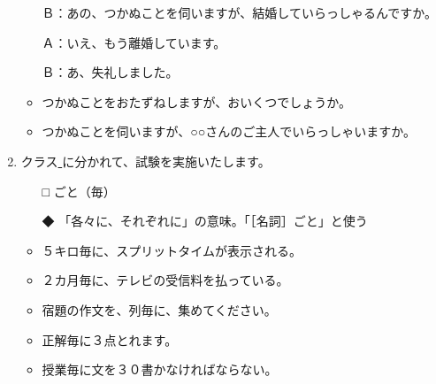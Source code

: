\documentclass[
uplatex,
b5paper,
10pt,
dvipdfmx
]{jsbook}
\begin{document}
\begin{enumerate}
\begin{itemize}
      Ｂ：あの、つかぬことを伺いますが、結婚していらっしゃるんですか。

      Ａ：いえ、もう離婚しています。

      Ｂ：あ、失礼しました。

\item つかぬことをおたずねしますが、おいくつでしょうか。
\item つかぬことを伺いますが、○○さんのご主人でいらっしゃいますか。
\end{itemize}

\item クラス\underline{   }に分かれて、試験を実施いたします。
\begin{itemize}
\item[□] ごと（毎）
\item[◆] 「各々に、それぞれに」の意味。「［名詞］ごと」と使う
\end{itemize}
\begin{itemize}
\item ５キロ毎に、スプリットタイムが表示される。
\item ２カ月毎に、テレビの受信料を払っている。
\item 宿題の作文を、列毎に、集めてください。
\item 正解毎に３点とれます。
\item 授業毎に文を３０書かなければならない。
\end{itemize}
\end{enumerate}
\end{document}
